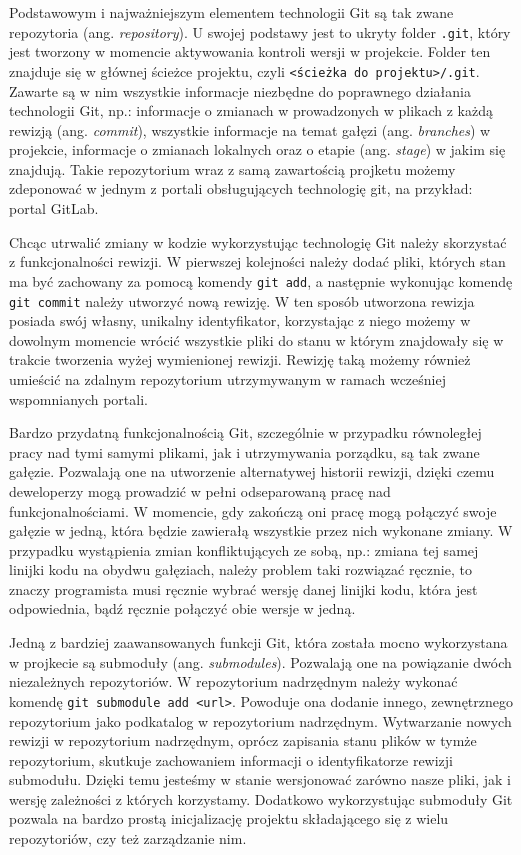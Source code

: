 Podstawowym i najważniejszym elementem technologii Git są tak zwane repozytoria (ang. \emph{repository}). U swojej podstawy jest to ukryty folder \lstinline{.git}, który jest tworzony w momencie aktywowania kontroli wersji w projekcie. Folder ten znajduje się w głównej ścieżce projektu, czyli \lstinline{<ścieżka do projektu>/.git}. Zawarte są w nim wszystkie informacje niezbędne do poprawnego działania technologii Git, np.: informacje o zmianach w prowadzonych w plikach z każdą rewizją (ang. \emph{commit}), wszystkie informacje na temat gałęzi (ang. \emph{branches}) w projekcie, informacje o zmianach lokalnych oraz o etapie (ang. \emph{stage}) w jakim się znajdują. Takie repozytorium wraz z samą zawartością projketu możemy zdeponować w jednym z portali obsługujących technologię git, na przykład: portal GitLab.

Chcąc utrwalić zmiany w kodzie wykorzystując technologię Git należy skorzystać z funkcjonalności rewizji. W pierwszej kolejności należy dodać pliki, których stan ma być zachowany za pomocą komendy \lstinline{git add}, a następnie wykonując komendę \lstinline{git commit} należy utworzyć nową rewizję. W ten sposób utworzona rewizja posiada swój własny, unikalny identyfikator, korzystając z niego możemy w dowolnym momencie wrócić wszystkie pliki do stanu w którym znajdowały się w trakcie tworzenia wyżej wymienionej rewizji. Rewizję taką możemy również umieścić na zdalnym repozytorium utrzymywanym w ramach wcześniej wspomnianych portali.

Bardzo przydatną funkcjonalnością Git, szczególnie w przypadku równoległej pracy nad tymi samymi plikami, jak i utrzymywania porządku, są tak zwane gałęzie. Pozwalają one na utworzenie alternatywej historii rewizji, dzięki czemu deweloperzy mogą prowadzić w pełni odseparowaną pracę nad funkcjonalnościami. W momencie, gdy zakończą oni pracę mogą połączyć swoje gałęzie w jedną, która będzie zawierałą wszystkie przez nich wykonane zmiany. W przypadku wystąpienia zmian konfliktujących ze sobą, np.: zmiana tej samej linijki kodu na obydwu gałęziach, należy problem taki rozwiązać ręcznie, to znaczy programista musi ręcznie wybrać wersję danej linijki kodu, która jest odpowiednia, bądź ręcznie połączyć obie wersje w jedną.

Jedną z bardziej zaawansowanych funkcji Git, która została mocno wykorzystana w projkecie są submoduły (ang. \emph{submodules}). Pozwalają one na powiązanie dwóch niezależnych repozytoriów. W repozytorium nadrzędnym należy wykonać komendę \lstinline{git submodule add <url>}. Powoduje ona dodanie innego, zewnętrznego repozytorium jako podkatalog w repozytorium nadrzędnym. Wytwarzanie nowych rewizji w repozytorium nadrzędnym, oprócz zapisania stanu plików w tymże repozytorium, skutkuje zachowaniem informacji o identyfikatorze rewizji submodułu. Dzięki temu jesteśmy w stanie wersjonować zarówno nasze pliki, jak i wersję zależności z których korzystamy. Dodatkowo wykorzystując submoduły Git pozwala na bardzo prostą inicjalizację projektu składającego się z wielu repozytoriów, czy też zarządzanie nim.
